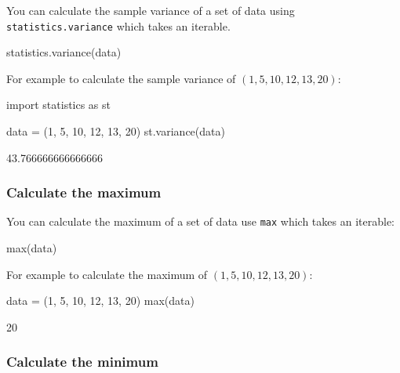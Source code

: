 You can calculate the sample variance of a set of data using \texttt{statistics.variance} which takes an
iterable.


\begin{pyin}
statistics.variance(data)
\end{pyin}



For example to calculate the sample variance of \((1, 5, 10, 12, 13, 20)\):




\begin{pyin}
import statistics as st

data = (1, 5, 10, 12, 13, 20)
st.variance(data)
\end{pyin}





\begin{raw}
43.766666666666666
\end{raw}





\subsubsection{Calculate the maximum}
\label{\detokenize{tools-for-mathematics/08-statistics/how/main:calculate-the-maximum}}

You can calculate the maximum of a set of data use \texttt{max} which takes an iterable:


\begin{pyin}
max(data)
\end{pyin}



For example to calculate the maximum of \((1, 5, 10, 12, 13, 20)\):




\begin{pyin}
data = (1, 5, 10, 12, 13, 20)
max(data)
\end{pyin}





\begin{raw}
20
\end{raw}





\subsubsection{Calculate the minimum}
\label{\detokenize{tools-for-mathematics/08-statistics/how/main:calculate-the-minimum}}


